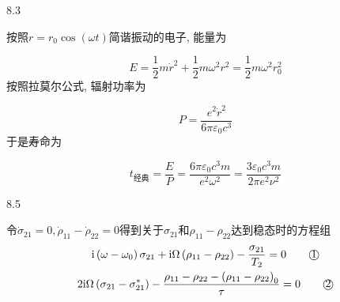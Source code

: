 8.3

按照\(r=r_0\cos(\omega t)\)简谐振动的电子, 能量为

\[E=\frac{1}{2} m \dot{r}^{2}+\frac{1}{2} m \omega^{2} r^{2}=\frac{1}{2} m \omega^{2} r_{0}^{2} \]
按照拉莫尔公式, 辐射功率为

\[P=\frac{e^{2} \dot{r}^{2}}{6 \pi \varepsilon_{0} c^{3}} \]
于是寿命为

\[t_{\text{经典}}=\frac{E}{P}=\frac{6 \pi \varepsilon_{0} c^{3} m}{e^{2} \omega^{2}}=\frac{3 \varepsilon_{0} c^{3} m}{2 \pi e^{2} \nu^{2}} \]


8.5

令\(\dot{\sigma}_{21}=0, \dot{\rho}_{11}-\dot{\rho}_{22}=0\)得到关于$\sigma_{21}$和$\rho_{11}-\rho_{22}$达到稳态时的方程组
\begin{gather*}
\mathrm{i}\left(\omega-\omega_{0}\right) \sigma_{21}+\mathrm{i} \Omega\left(\rho_{11}-\rho_{22}\right)-\frac{\sigma_{21}}{T_{2}}=0
\tag*{\textcircled{1}}\label{1}\\ 
2\mathrm{i}  \Omega\left(\sigma_{21}-\sigma_{21}^{*}\right)-\frac{\rho_{11}-\rho_{22}-\left(\rho_{11}-\rho_{22}\right)_{0}}{\tau}=0 
\tag*{\textcircled{2}}\label{2}   
\end{gather*}

